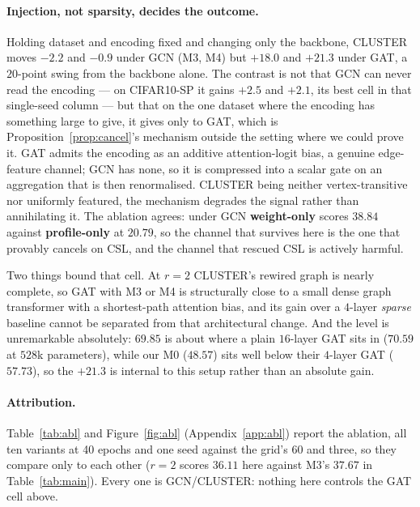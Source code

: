 \documentclass[11pt]{article}
\begin{document}
\paragraph{Injection, not sparsity, decides the outcome.}
Holding dataset and encoding fixed and changing only the backbone, CLUSTER moves $-2.2$ and
$-0.9$ under GCN (M3, M4) but $+18.0$ and $+21.3$ under GAT, a $20$-point swing from the
backbone alone. The contrast is not that GCN can never read the encoding --- on CIFAR10-SP it gains
$+2.5$ and $+2.1$, its best cell in that single-seed column --- but that on the one dataset where
the encoding has something large to give, it gives only to GAT, which is
Proposition~\ref{prop:cancel}'s mechanism outside the setting where we could prove it. GAT admits
the encoding as an additive attention-logit bias, a genuine edge-feature channel; GCN has none,
so it is compressed into a scalar gate on an aggregation that is then renormalised. CLUSTER being
neither vertex-transitive nor uniformly featured, the mechanism degrades the signal rather than
annihilating it. The ablation agrees: under GCN \textbf{weight-only} scores $38.84$ against
\textbf{profile-only} at $20.79$, so the channel that survives here is the one that provably
cancels on CSL, and the channel that rescued CSL is actively harmful.

Two things bound that cell. At $r=2$ CLUSTER's rewired graph is nearly complete, so GAT with M3
or M4 is structurally close to a small dense graph transformer with a shortest-path attention
bias, and its gain over a $4$-layer \emph{sparse} baseline cannot be separated from that
architectural change. And the level is unremarkable absolutely: $69.85$ is about where a plain
$16$-layer GAT sits in \citet{dwivedi2023benchmarking} ($70.59$ at $528$k parameters), while our
M0 ($48.57$) sits well below their $4$-layer GAT ($57.73$), so the $+21.3$ is internal to this
setup rather than an absolute gain.

\paragraph{Attribution.}
Table~\ref{tab:abl} and Figure~\ref{fig:abl} (Appendix~\ref{app:abl}) report the ablation, all
ten variants at 40 epochs and one seed against the grid's 60 and three, so they compare only to
each other ($r=2$ scores $36.11$ here against M3's $37.67$ in Table~\ref{tab:main}). Every one is
GCN/CLUSTER: nothing here controls the GAT cell above.
\end{document}
